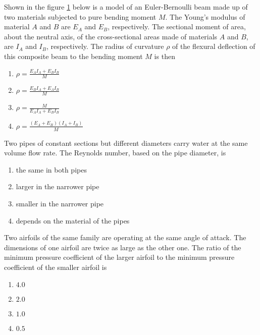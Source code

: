 \iffalse
\chapter{2007}
\author{AI24BTECH11015 - Harshvardhan Patidar}
\section{ae}
\fi

	\item Shown in the figure \ref{25} below is a model of an Euler-Bernoulli beam made up of two materials subjected to pure bending moment $M$. The Young's modulus of material $A$ and $B$ are $E_A$ and $E_B$, respectively. The sectional moment of area, about the neutral axis, of the cross-sectional areas made of materials $A$ and $B$, are $I_A$ and $I_B$, respectively. The radius of curvature $\rho$ of the flexural deflection of this composite beam to the bending moment $M$ is then

		\begin{figure}[H]
			\centering
			
			\caption{}
			\label{25}
		\end{figure}


		\begin{enumerate}
    			\item $ \rho = \frac{E_A I_A + E_B I_B}{M} $
   			\item $ \rho = \frac{E_B I_A + E_A I_B}{M} $
  			\item $ \rho = \frac{M}{E_A I_A + E_B I_B} $
  			\item $ \rho = \frac{(E_A + E_B)(I_A + I_B)}{M} $
		\end{enumerate}


	\item Two pipes of constant sections but different diameters carry water at the same volume flow rate. The Reynolds number, based on the pipe diameter, is
		\begin{enumerate}
    			\item the same in both pipes
    			\item larger in the narrower pipe
    			\item smaller in the narrower pipe
    			\item depends on the material of the pipes
		\end{enumerate}

	\item 	Two airfoils of the same family are operating at the same angle of attack. The dimensions of one airfoil are twice as large as the other one. The ratio of the minimum pressure coefficient of the larger airfoil to the minimum pressure coefficient of the smaller airfoil is
		\begin{enumerate}
			\item $4.0$
    			\item $2.0$
    			\item $1.0$
    			\item $0.5$
		\end{enumerate}


